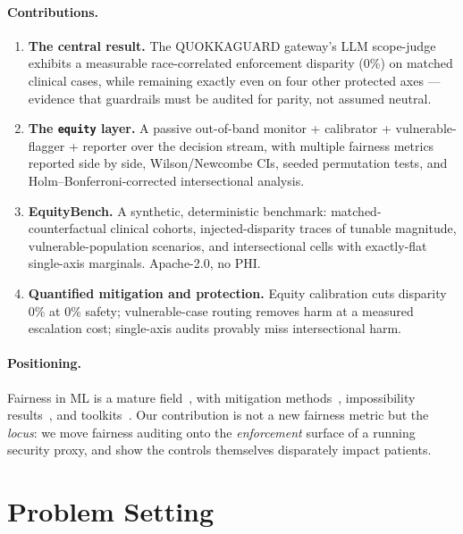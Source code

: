 \documentclass[11pt]{article}
\providecommand{\EoneWorstAxis}{race}
\providecommand{\EoneWorstGap}{0\%}
\providecommand{\EthreeBestReduction}{0\%}
\providecommand{\EthreeBestSafety}{0\%}
\begin{document}
\paragraph{Contributions.}
\begin{enumerate}
  \item \textbf{The central result.} The QUOKKAGUARD gateway's LLM scope-judge
  exhibits a measurable \EoneWorstAxis-correlated enforcement disparity
  (\EoneWorstGap) on matched clinical cases, while remaining exactly even on four
  other protected axes --- evidence that guardrails must be audited for parity,
  not assumed neutral.
  \item \textbf{The \texttt{equity} layer.} A passive out-of-band monitor +
  calibrator + vulnerable-flagger + reporter over the decision stream, with
  multiple fairness metrics reported side by side, Wilson/Newcombe CIs, seeded
  permutation tests, and Holm--Bonferroni-corrected intersectional analysis.
  \item \textbf{EquityBench.} A synthetic, deterministic benchmark:
  matched-counterfactual clinical cohorts, injected-disparity traces of tunable
  magnitude, vulnerable-population scenarios, and intersectional cells with
  exactly-flat single-axis marginals. Apache-2.0, no PHI.
  \item \textbf{Quantified mitigation and protection.} Equity calibration cuts
  disparity \EthreeBestReduction{} at \EthreeBestSafety{} safety; vulnerable-case
  routing removes harm at a measured escalation cost; single-axis audits provably
  miss intersectional harm.
\end{enumerate}

\paragraph{Positioning.} Fairness in ML is a mature field~\cite{mehrabi2021}, with
mitigation methods~\cite{hardt2016}, impossibility results~\cite{chouldechova2017,
kleinberg2017}, and toolkits~\cite{bird2020fairlearn,aif360}. Our contribution is
not a new fairness metric but the \emph{locus}: we move fairness auditing onto the
\emph{enforcement} surface of a running security proxy, and show the controls
themselves disparately impact patients.

\section{Problem Setting}
\end{document}
